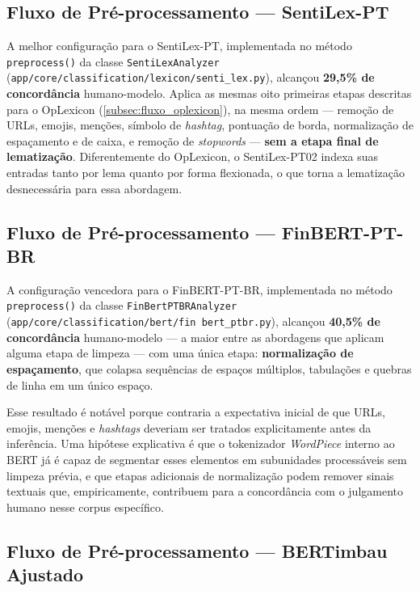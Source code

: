 \subsection{Fluxo de Pré-processamento --- SentiLex-PT}
\label{subsec:fluxo_sentilex}

A melhor configuração para o SentiLex-PT, implementada no método \texttt{preprocess()} da classe \texttt{SentiLexAnalyzer} (\texttt{app/core/classification/lexicon/senti\_lex.py}), alcançou \textbf{29,5\% de concordância} humano-modelo. Aplica as mesmas oito primeiras etapas descritas para o OpLexicon (\autoref{subsec:fluxo_oplexicon}), na mesma ordem --- remoção de URLs, emojis, menções, símbolo de \textit{hashtag}, pontuação de borda, normalização de espaçamento e de caixa, e remoção de \textit{stopwords} --- \textbf{sem a etapa final de lematização}. Diferentemente do OpLexicon, o SentiLex-PT02 indexa suas entradas tanto por lema quanto por forma flexionada, o que torna a lematização desnecessária para essa abordagem.

\subsection{Fluxo de Pré-processamento --- FinBERT-PT-BR}
\label{subsec:fluxo_finbert}

A configuração vencedora para o FinBERT-PT-BR, implementada no método \texttt{preprocess()} da classe \texttt{FinBertPTBRAnalyzer} (\texttt{app/core/classification/bert/fin bert\_ptbr.py}), alcançou \textbf{40,5\% de concordância} humano-modelo --- a maior entre as abordagens que aplicam alguma etapa de limpeza --- com uma única etapa: \textbf{normalização de espaçamento}, que colapsa sequências de espaços múltiplos, tabulações e quebras de linha em um único espaço.

Esse resultado é notável porque contraria a expectativa inicial de que URLs, emojis, menções e \textit{hashtags} deveriam ser tratados explicitamente antes da inferência. Uma hipótese explicativa é que o tokenizador \textit{WordPiece} interno ao BERT \cite{devlin2019} já é capaz de segmentar esses elementos em subunidades processáveis sem limpeza prévia, e que etapas adicionais de normalização podem remover sinais textuais que, empiricamente, contribuem para a concordância com o julgamento humano nesse corpus específico.

\subsection{Fluxo de Pré-processamento --- BERTimbau Ajustado}
\label{subsec:fluxo_bertimbau}

